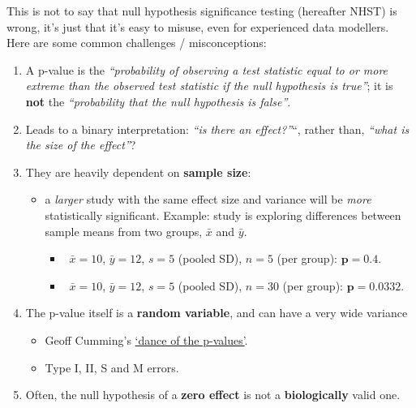 \documentclass[]{book}
\providecommand{\tightlist}{%
  \setlength{\itemsep}{0pt}\setlength{\parskip}{0pt}}
\theoremstyle{definition}
\theoremstyle{definition}
\theoremstyle{definition}
\theoremstyle{remark}
\begin{document}
This is not to say that null hypothesis significance testing (hereafter
NHST) is wrong, it's just that it's easy to misuse, even for experienced
data modellers. Here are some common challenges / misconceptions:

\begin{enumerate}
\def\labelenumi{\arabic{enumi}.}
\tightlist
\item
  A p-value is the \emph{``probability of observing a test statistic
  equal to or more extreme than the observed test statistic if the null
  hypothesis is true''}; it is \textbf{not} the \emph{``probability that
  the null hypothesis is false''}.
\item
  Leads to a binary interpretation: \emph{``is there an effect?''}``,
  rather than, \emph{``what is the size of the effect''}?
\item
  They are heavily dependent on \textbf{sample size}:

  \begin{itemize}
  \tightlist
  \item
    a \emph{larger} study with the same effect size and variance will be
    \emph{more} statistically significant. Example: study is exploring
    differences between sample means from two groups, \(\bar{x}\) and
    \(\bar{y}\).

    \begin{itemize}
    \tightlist
    \item
      \(~~\bar{x} = 10\), \(\bar{y} = 12\), \(s = 5\) (pooled SD),
      \(n = 5\) (per group): \(\mathbf{p = 0.4}\).
    \item
      \(~~\bar{x} = 10\), \(\bar{y} = 12\), \(s = 5\) (pooled SD),
      \(n = 30\) (per group): \(\mathbf{p = 0.0332}\).
    \end{itemize}
  \end{itemize}
\item
  The p-value itself is a \textbf{random variable}, and can have a very
  wide variance

  \begin{itemize}
  \tightlist
  \item
    Geoff Cumming's
    \href{https://www.youtube.com/embed/5OL1RqHrZQ8}{`dance of the
    p-values'}.
  \item
    Type I, II, S and M errors.
  \end{itemize}
\item
  Often, the null hypothesis of a \textbf{zero effect} is not a
  \textbf{biologically} valid one.


\end{enumerate}
\end{document}
